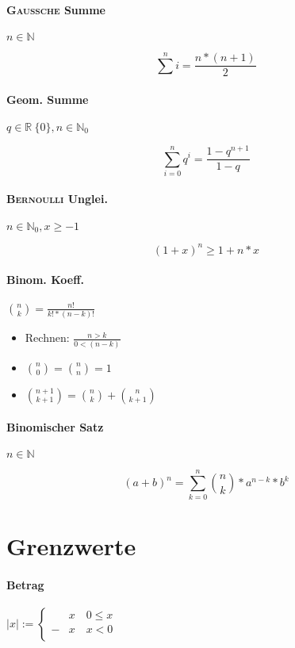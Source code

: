 \paragraph{\textsc{Gaussche} Summe} $n \in \mathbb{N}$

$$\sum^n i = \frac{n * (n + 1)}{2}$$

\paragraph{Geom. Summe} $q \in \mathbb{R} \ \{ 0 \}, n \in \mathbb{N}_0$

$$\sum_{i=0}^n q^i = \frac{1 - q^{n+1}}{1 - q}$$

\paragraph{\textsc{Bernoulli} Unglei.} $n \in \mathbb{N}_0, x \geq -1$

$$(1 + x)^n \geq 1 + n * x$$

\paragraph{Binom. Koeff.} $\binom{n}{k} = \frac{n!}{k! * (n - k)!}$

\begin{itemize}
  \item Rechnen: $\frac{n > k}{0 < (n - k)}$

  \item $\binom{n}{0} = \binom{n}{n} = 1$

  \item $\binom{n + 1}{k + 1} = \binom{n}{k} + \binom{n}{k + 1}$
\end{itemize}

\paragraph{Binomischer Satz} $n \in \mathbb{N}$

$$(a + b)^n = \sum_{k=0}^n \binom{n}{k} * a^{n - k} * b^k$$

\section{Grenzwerte}

\paragraph{Betrag} $|x| := \begin{cases}
      & x \quad 0 \leq x \\
    - & x \quad x < 0    \\
  \end{cases}$

